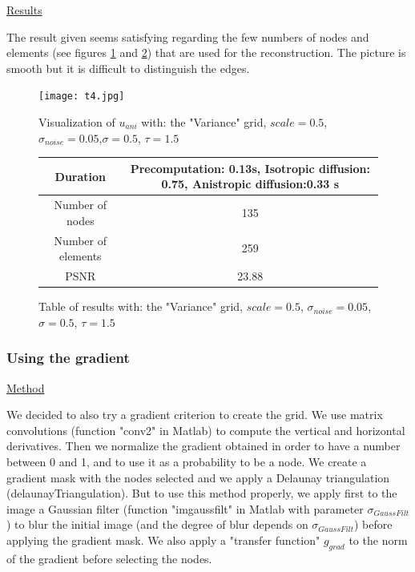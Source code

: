 \documentclass{report}
\begin{document}
        
        
        
\underline{Results}

The result given seems satisfying regarding the few numbers of nodes and elements (see figures \ref{t4} and  \ref{T4}) that are used for the reconstruction. The picture is smooth but it is difficult to distinguish the edges. 


        \begin{figure}[h!]
        \label{t4}
        \centering
        \caption{Visualization of $u_{ani}$ with: the "Variance" grid, $scale=0.5$, $\sigma_{noise}=0.05$,$\sigma=0.5$, $\tau=1.5$}
        \texttt{[image: t4.jpg]}
        \end{figure}
        


        \begin{figure}[h!]
        \centering
        \label{T4}
        \caption{Table of results with: the "Variance" grid, $scale=0.5$, $\sigma_{noise}=0.05$,$\sigma=0.5$, $\tau=1.5$}
        \begin{tabular}{|c|c|}
          \hline
         Duration &  Precomputation: 0.13s,
         Isotropic diffusion: 0.75,
         Anistropic diffusion:0.33 s   \\
        \hline
         Number of nodes & 135 \\
         \hline
         Number of elements & 259\\
 
         \hline
         PSNR & 23.88 \\
         \hline
        \end{tabular}
        \end{figure}






\subsubsection{Using the gradient}
\underline{Method}


We decided to also try a gradient criterion to create the grid. 
We use matrix convolutions (function "conv2" in Matlab) to compute the vertical and horizontal derivatives. Then we normalize the gradient obtained in order to have a number between 0 and 1, and to use it as a probability to be a node. We create a gradient mask with the nodes selected and we apply a Delaunay triangulation (delaunayTriangulation). But to use this method properly, we apply first to the image a Gaussian filter (function "imgaussfilt" in Matlab with parameter $\sigma_{GaussFilt}$) to blur the initial image (and the degree of blur depends on $\sigma_{GaussFilt}$) before applying the gradient mask. We also apply a "transfer function" $g_{grad}$ to the norm of the gradient before selecting the nodes. 
\end{document}
